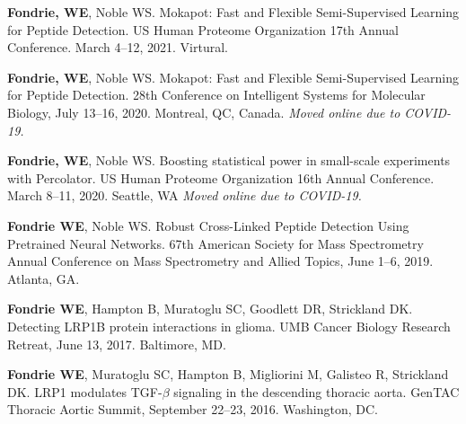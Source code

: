 \documentclass[11pt]{article}
\newcommand{\mysection}[1]{\vspace{1ex \textbf{\large \textrm{#1}} \quad
    \hrulefill}}
\begin{document}
\newpage

\mysection{Posters}
\begin{etaremune}
  \item \textbf{Fondrie, WE}, Noble WS. Mokapot: Fast and Flexible
  Semi-Supervised Learning for Peptide Detection. US Human Proteome
  Organization 17th Annual Conference. March 4--12, 2021. Virtural.

  \item \textbf{Fondrie, WE}, Noble WS. Mokapot: Fast and Flexible
  Semi-Supervised Learning for Peptide Detection. 28th Conference on
  Intelligent Systems for Molecular Biology, July 13--16, 2020. Montreal, QC,
  Canada. \textit{Moved online due to COVID-19.}
  
  \item \textbf{Fondrie, WE}, Noble WS. Boosting statistical power in
  small-scale experiments with Percolator. US Human Proteome Organization 16th
  Annual Conference. March 8--11, 2020. Seattle, WA \textit{Moved online due to
    COVID-19.}
  
  
  \item \textbf{Fondrie WE}, Noble WS. Robust Cross-Linked Peptide Detection
  Using Pretrained Neural Networks. 67th American Society for Mass Spectrometry
  Annual Conference on Mass Spectrometry and Allied Topics, June 1--6, 2019.
  Atlanta, GA.


  \item \textbf{Fondrie WE}, Hampton B, Muratoglu SC, Goodlett DR, Strickland
  DK. Detecting LRP1B protein interactions in glioma. UMB Cancer Biology
  Research Retreat, June 13, 2017. Baltimore, MD.

  \item \textbf{Fondrie WE}, Muratoglu SC, Hampton B, Migliorini M, Galisteo R,
  Strickland DK. LRP1 modulates TGF-$\beta$ signaling in the descending
  thoracic aorta. GenTAC Thoracic Aortic Summit, September 22--23, 2016.
  Washington, DC.


\end{etaremune}
\end{document}
